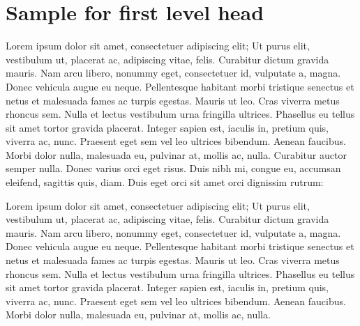 \documentclass[CJCE,STIX2COL]{WileyNJD-v2}
\begin{document}

\maketitle

\section{Sample for first level head}\label{sec1}

Lorem ipsum dolor sit amet, consectetuer adipiscing elit\cite{ennis1994}; Ut purus elit, vestibulum ut, placerat ac, adipiscing vitae, felis. Curabitur dictum gravida mauris. Nam arcu libero, nonummy eget, consectetuer id, vulputate a, magna. Donec vehicula augue eu neque. Pellentesque habitant morbi tristique senectus et netus et malesuada fames ac turpis egestas.  Mauris ut leo. Cras viverra metus rhoncus sem. Nulla et lectus vestibulum urna fringilla ultrices. Phasellus eu tellus sit amet tortor gravida placerat. Integer sapien est, iaculis in, pretium quis, viverra ac, nunc. Praesent eget sem vel leo ultrices bibendum. Aenean faucibus. Morbi dolor nulla, malesuada eu, pulvinar at, mollis ac, nulla. Curabitur auctor semper nulla. Donec varius orci eget risus. Duis nibh mi, congue eu, accumsan eleifend, sagittis quis, diam.  Duis eget orci sit amet orci dignissim rutrum:

Lorem ipsum dolor sit amet, consectetuer adipiscing elit\cite{ennis1994}; Ut purus elit, vestibulum ut, placerat ac, adipiscing vitae, felis. Curabitur dictum gravida mauris. Nam arcu libero, nonummy eget, consectetuer id, vulputate a, magna. Donec vehicula augue eu neque. Pellentesque habitant morbi tristique senectus et netus et malesuada fames ac turpis egestas.  Mauris ut leo. Cras viverra metus rhoncus sem. Nulla et lectus vestibulum urna fringilla ultrices. Phasellus eu tellus sit amet tortor gravida placerat. Integer sapien est, iaculis in, pretium quis, viverra ac, nunc. Praesent eget sem vel leo ultrices bibendum. Aenean faucibus. Morbi dolor nulla, malesuada eu, pulvinar at, mollis ac, nulla.
\end{document}
